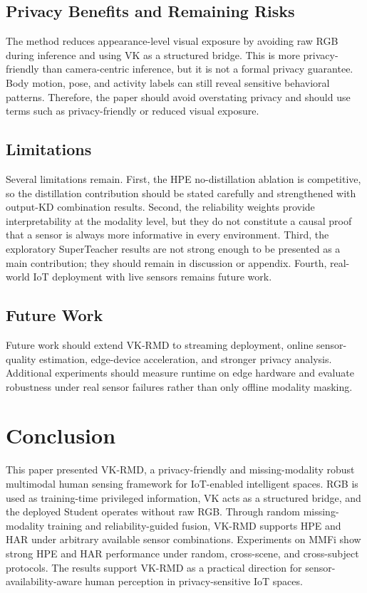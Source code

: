 \documentclass[journal]{IEEEtran}
\begin{document}
\subsection{Privacy Benefits and Remaining Risks}

The method reduces appearance-level visual exposure by avoiding raw RGB during inference and using VK as a structured bridge. This is more privacy-friendly than camera-centric inference, but it is not a formal privacy guarantee. Body motion, pose, and activity labels can still reveal sensitive behavioral patterns. Therefore, the paper should avoid overstating privacy and should use terms such as privacy-friendly or reduced visual exposure.

\subsection{Limitations}

Several limitations remain. First, the HPE no-distillation ablation is competitive, so the distillation contribution should be stated carefully and strengthened with output-KD combination results. Second, the reliability weights provide interpretability at the modality level, but they do not constitute a causal proof that a sensor is always more informative in every environment. Third, the exploratory SuperTeacher results are not strong enough to be presented as a main contribution; they should remain in discussion or appendix. Fourth, real-world IoT deployment with live sensors remains future work.

\subsection{Future Work}

Future work should extend VK-RMD to streaming deployment, online sensor-quality estimation, edge-device acceleration, and stronger privacy analysis. Additional experiments should measure runtime on edge hardware and evaluate robustness under real sensor failures rather than only offline modality masking.

\section{Conclusion}

This paper presented VK-RMD, a privacy-friendly and missing-modality robust multimodal human sensing framework for IoT-enabled intelligent spaces. RGB is used as training-time privileged information, VK acts as a structured bridge, and the deployed Student operates without raw RGB. Through random missing-modality training and reliability-guided fusion, VK-RMD supports HPE and HAR under arbitrary available sensor combinations. Experiments on MMFi show strong HPE and HAR performance under random, cross-scene, and cross-subject protocols. The results support VK-RMD as a practical direction for sensor-availability-aware human perception in privacy-sensitive IoT spaces.
\end{document}
